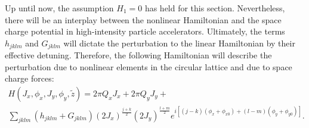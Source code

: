 Up until now, the assumption $H_1=0$ has held for this section. Nevertheless, there will be an interplay between the nonlinear Hamiltonian and the space charge potential in high-intensity particle accelerators. Ultimately, the terms $h_{jklm}$ and $G_{jklm}$ will dictate the perturbation to the linear Hamiltonian by their effective detuning. Therefore, the following Hamiltonian will describe the perturbation due to nonlinear elements in the circular lattice and due to space charge forces:
 \begin{multline}
    \label{eq:hfinal}
    H(J_x,\phi_x,J_y, \phi_y,\tilde{z})= 2\pi Q_x J_x + 2\pi Q_y J_y + \\
    \sum_{jklm} \left( h_{jklm}+G_{jklm} \right) \left( 2 J_x\right)^{\frac{j+k}{2}} \left( 2 J_y\right)^{\frac{l+m}{2}} e^{i\left[ \left( j-k \right)\left( \phi_x+\phi_{x0} \right)+ \left( l-m \right) \left( \phi_y+\phi_{y0} \right)\right]}.
\end{multline}